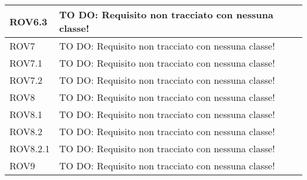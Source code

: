 \begin{center}
\begin{longtable}{| p{2.5cm} | p{11cm} |}
\hline
ROV6.3 & TO DO: Requisito non tracciato con nessuna classe! \\
\hline
ROV7 & TO DO: Requisito non tracciato con nessuna classe! \\
\hline
ROV7.1 & TO DO: Requisito non tracciato con nessuna classe! \\
\hline
ROV7.2 & TO DO: Requisito non tracciato con nessuna classe! \\
\hline
ROV8 & TO DO: Requisito non tracciato con nessuna classe! \\
\hline
ROV8.1 & TO DO: Requisito non tracciato con nessuna classe! \\
\hline
ROV8.2 & TO DO: Requisito non tracciato con nessuna classe! \\
\hline
ROV8.2.1 & TO DO: Requisito non tracciato con nessuna classe! \\
\hline
ROV9 & TO DO: Requisito non tracciato con nessuna classe! \\
\hline
\end{longtable}
\egroup
\end{center}
